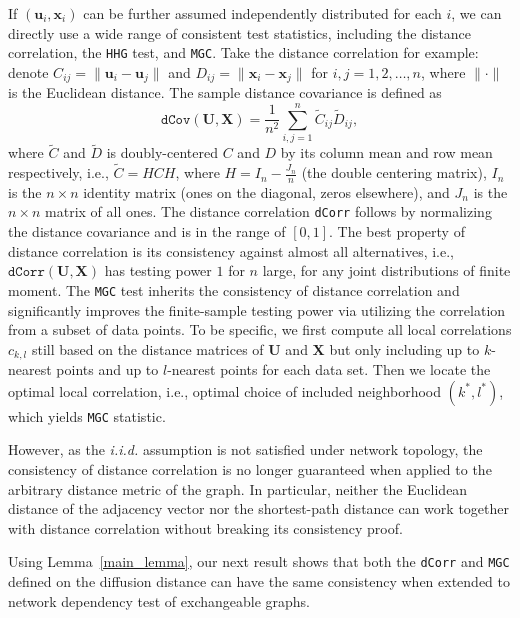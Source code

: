 \documentclass[11pt]{article}
\theoremstyle{definition}
\begin{document}
If $(\mathbf{u}_{i}, \mathbf{x}_{i} )$ can be further assumed independently distributed for each $i$, we can directly use a wide range of consistent test statistics, including the distance correlation, the \texttt{HHG} test, and \texttt{MGC}. Take the distance correlation for example: denote $C_{ij} = \parallel \mathbf{u}_{i} - \mathbf{u}_{j} \parallel$ and $D_{ij} = \parallel \mathbf{x}_{i} - \mathbf{x}_{j} \parallel$ for $i,j=1,2, \ldots ,n$, where $\parallel \cdot \parallel$ is the Euclidean distance. The sample distance covariance is defined as 
\begin{equation}	 
\label{eq:dCov}
\texttt{dCov}(\mathbf{U}, \mathbf{X}) = \frac{1}{n^2} \sum\limits_{i,j=1}^{n} \tilde{C}_{ij} \tilde{D}_{ij},
\end{equation}
where $\tilde{C}$ and $\tilde{D}$ is doubly-centered $C$ and $D$ by its column mean and row mean respectively, i.e., $\tilde{C}=HCH$, where $H=I_{n}-\frac{J_{n}}{n}$ (the double centering matrix), $I_n$ is the $n \times n$ identity matrix (ones on the diagonal, zeros elsewhere), and $J_n$ is the $n \times n$ matrix of all ones. The distance correlation \texttt{dCorr} follows by normalizing the distance covariance and is in the range of $[0,1]$. The best property of distance correlation is its consistency against almost all alternatives, i.e., $\texttt{dCorr}(\mathbf{U}, \mathbf{X})$ has testing power $1$ for $n$ large, for any joint distributions of finite moment. The \texttt{MGC} test inherits the consistency of distance correlation and significantly improves the finite-sample testing power via utilizing the correlation from a subset of data points. To be specific, we first compute all local correlations $c_{k,l}$ still based on the distance matrices of $\mathbf{U}$ and $\mathbf{X}$ but only including up to $k$-nearest points and up to $l$-nearest points for each data set. Then we locate the optimal local correlation, i.e., optimal choice of included neighborhood $(k^{*}, l^{*})$, which yields \texttt{MGC} statistic.

However, as the \textit{i.i.d.} assumption is not satisfied under network topology, the consistency of distance correlation is no longer guaranteed when applied to the arbitrary distance metric of the graph. In particular, neither the Euclidean distance of the adjacency vector nor the shortest-path distance can work together with distance correlation without breaking its consistency proof. 

Using Lemma~\ref{main_lemma}, our next result shows that both the \texttt{dCorr} and \texttt{MGC} defined on the diffusion distance can have the same consistency when extended to network dependency test of exchangeable graphs.  
\end{document}
